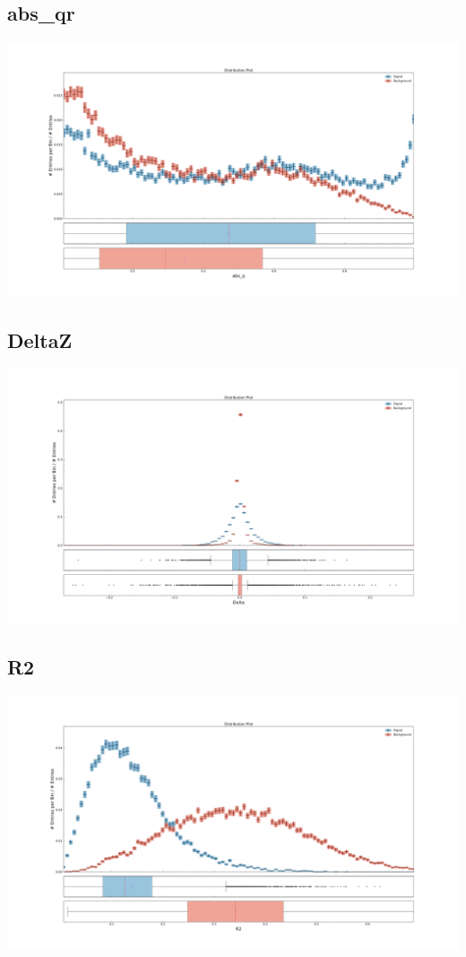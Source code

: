 \documentclass[10pt,a4paper]{article}
\begin{document}
\subsection{abs\_qr}
\begin{center}
\includegraphics[width=1.0\textwidth]{variable_-4147889784464216133.pdf}
\end{center}
\subsection{DeltaZ}
\begin{center}
\includegraphics[width=1.0\textwidth]{variable_46695612224267318.pdf}
\end{center}
\subsection{R2}
\begin{center}
\includegraphics[width=1.0\textwidth]{variable_-7803083240874270818.pdf}
\end{center}
\raggedbottom
\pagebreak[0]
\FloatBarrier
\end{document}
